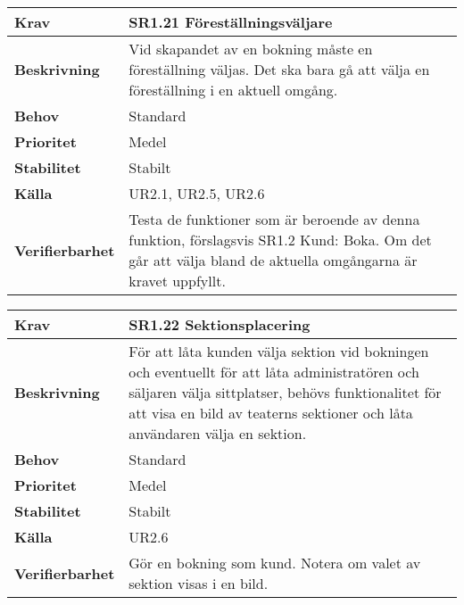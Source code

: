 \documentclass[a4paper, twoside, 11pt, titlepage]{article}
\begin{document}
		\begin {table} [ht] \begin{tabular} { p{2.6cm} p{12.5cm} }
			\hline
			\sffamily\textbf{Krav} & \sffamily\textbf{SR1.21 Föreställningsväljare } \\
			\hline
			\sffamily\textbf{Beskrivning} & Vid skapandet av en bokning måste en föreställning väljas. Det ska bara gå att välja en föreställning i en aktuell omgång.  \\
			\hline
			\sffamily\textbf{Behov} & Standard  \\
			\hline
			\sffamily\textbf{Prioritet} & Medel  \\
			\hline
			\sffamily\textbf{Stabilitet} & Stabilt  \\
			\hline
			\sffamily\textbf{Källa} & UR2.1, UR2.5, UR2.6  \\
			\hline
			\sffamily\textbf{Verifierbarhet} & Testa de funktioner som är beroende av denna funktion, förslagsvis SR1.2 Kund: Boka. Om det går att välja bland de aktuella omgångarna är kravet uppfyllt.  \\
			\hline
		\end{tabular} \end{table} \FloatBarrier
		\vspace{6mm}

		\begin {table} [ht] \begin{tabular} { p{2.6cm} p{12.5cm} }
			\hline
			\sffamily\textbf{Krav} & \sffamily\textbf{SR1.22 Sektionsplacering } \\
			\hline
			\sffamily\textbf{Beskrivning} & För att låta kunden välja sektion vid bokningen och eventuellt för att låta administratören och säljaren välja sittplatser, behövs funktionalitet för att visa en bild av teaterns sektioner och låta användaren välja en sektion.  \\
			\hline
			\sffamily\textbf{Behov} & Standard  \\
			\hline
			\sffamily\textbf{Prioritet} & Medel  \\
			\hline
			\sffamily\textbf{Stabilitet} & Stabilt  \\
			\hline
			\sffamily\textbf{Källa} & UR2.6  \\
			\hline
			\sffamily\textbf{Verifierbarhet} & Gör en bokning som kund. Notera om valet av sektion visas i en bild.  \\
			\hline
		\end{tabular} \end{table} \FloatBarrier
		\vspace{6mm}
\end{document}
